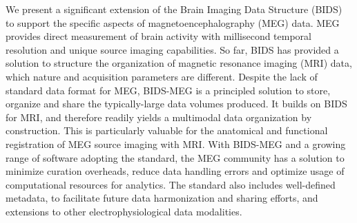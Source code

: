 
We present a significant extension of the Brain Imaging Data Structure (BIDS) to support the specific aspects of magnetoencephalography (MEG) data. MEG provides direct measurement of brain activity with millisecond temporal resolution and unique source imaging capabilities. So far, BIDS has provided a solution to structure the organization of magnetic resonance imaging (MRI) data, which nature and acquisition parameters are different. Despite the lack of standard data format for MEG, BIDS-MEG is a principled solution to store, organize and share the typically-large data volumes produced. It builds on BIDS for MRI, and therefore readily yields a multimodal data organization by construction. This is particularly valuable for the anatomical and functional registration of MEG source imaging with MRI. With BIDS-MEG and a growing range of software adopting the standard, the MEG community has a solution to minimize curation overheads, reduce data handling errors and optimize usage of computational resources for analytics. The standard also includes well-defined metadata, to facilitate future data harmonization and sharing efforts, and extensions to other electrophysiological data modalities. 

\noindent{}%

\clearpage
